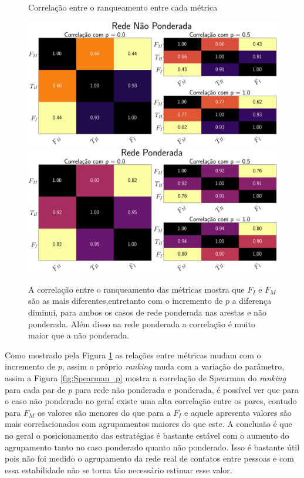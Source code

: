 \begin{figure}[H]
    \centering
    \captionsetup{font=normalsize,skip=0.8pt,singlelinecheck=on,labelsep=endash}
    \caption{Correlação entre o ranqueamento entre cada métrica}
    
    \includegraphics[scale= 0.4]{figuras/corr_p.png}
    \\
    \includegraphics[scale= 0.4]{figuras/corr_p_ponderado.png}
    \captionsetup{font=small,justification=justified}
    \caption*{A correlação entre o ranqueamento das métricas mostra que $F_I$ e $F_M$ são as mais diferentes,entretanto com o incremento de $p$ a diferença diminui, para ambos os casos de rede ponderada nas arestas e não ponderada. Além disso na rede ponderada a correlação é muito maior que a não ponderada.}
    \label{fig:Spearman}
\end{figure}

Como mostrado pela Figura \ref{fig:Spearman} as relações entre métricas mudam com o incremento de $p$, assim o próprio \textit{ranking} muda com a variação do parâmetro, assim a Figura \ref{fig:Spearman_p} mostra a correlação de Spearman do \textit{ranking} para cada par de $p$ para rede não ponderada e ponderada, é possível ver que para o caso não ponderado no geral existe uma alta correlação entre os pares, contudo para $F_M$ os valores são menores do que para a $F_I$ e aquele apresenta valores são mais correlacionados com agrupamentos maiores do que este. A conclusão é que no geral o posicionamento das estratégias é bastante estável com o aumento do agrupamento tanto no caso ponderado quanto não ponderado. Isso é bastante útil pois não foi medido o agrupamento da rede real de contatos entre pessoas e com essa estabilidade não se torna tão necessário estimar esse valor.

